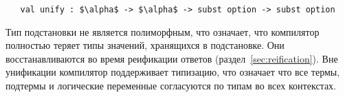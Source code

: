 \begin{lstlisting}
   val unify : $\alpha$ -> $\alpha$ -> subst option -> subst option
\end{lstlisting}

Тип подстановки не является полиморфным, что означает, что компилятор полностью теряет типы значений, хранящихся в подстановке.
Они восстанавливаются во время реификации ответов (раздел~\ref{sec:reification}).
Вне унификации компилятор поддерживает типизацию, что означает что все термы, подтермы и логические переменные согласуются по типам во всех контекстах.

